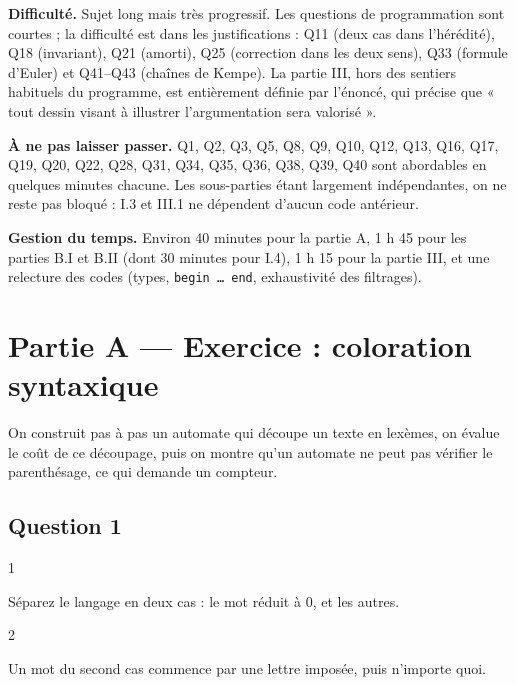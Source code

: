 \documentclass[11pt,a4paper]{article}
\begin{document}
\textbf{Difficulté.} Sujet long mais très progressif. Les questions de programmation sont courtes ; la difficulté est dans les justifications : Q11 (deux cas dans l'hérédité), Q18 (invariant), Q21 (amorti), Q25 (correction dans les deux sens), Q33 (formule d'Euler) et Q41--Q43 (chaînes de Kempe). La partie III, hors des sentiers habituels du programme, est entièrement définie par l'énoncé, qui précise que « tout dessin visant à illustrer l'argumentation sera valorisé ».

\textbf{À ne pas laisser passer.} Q1, Q2, Q3, Q5, Q8, Q9, Q10, Q12, Q13, Q16, Q17, Q19, Q20, Q22, Q28, Q31, Q34, Q35, Q36, Q38, Q39, Q40 sont abordables en quelques minutes chacune. Les sous-parties étant largement indépendantes, on ne reste pas bloqué : I.3 et III.1 ne dépendent d'aucun code antérieur.

\textbf{Gestion du temps.} Environ 40 minutes pour la partie A, 1 h 45 pour les parties B.I et B.II (dont 30 minutes pour I.4), 1 h 15 pour la partie III, et une relecture des codes (types, \texttt{begin\ …\ end}, exhaustivité des filtrages).

\hypertarget{partie-a-exercice-coloration-syntaxique}{%
\section{Partie A --- Exercice : coloration syntaxique}\label{partie-a-exercice-coloration-syntaxique}}

On construit pas à pas un automate qui découpe un texte en lexèmes, on évalue le coût de ce découpage, puis on montre qu'un automate ne peut pas vérifier le parenthésage, ce qui demande un compteur.

\hypertarget{question-1}{%
\subsection{Question 1}\label{question-1}}

\begin{indication}{1}

Séparez le langage en deux cas : le mot réduit à \(0\), et les autres.

\end{indication}

\begin{indication}{2}

Un mot du second cas commence par une lettre imposée, puis n'importe quoi.

\end{indication}
\end{document}
